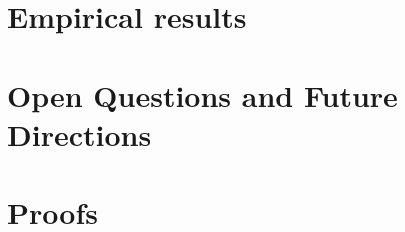 \documentclass[11pt]{article}
\numberwithin{equation}{section}
\theoremstyle{plain}
\theoremstyle{definition}
\theoremstyle{remark}
\begin{document}


\section{Empirical results}\label{sec:results}



\section{Open Questions and Future Directions}\label{sec:conclusion}





\newpage
\appendix
\section{Proofs}\label{app:proofs}




\end{document}

